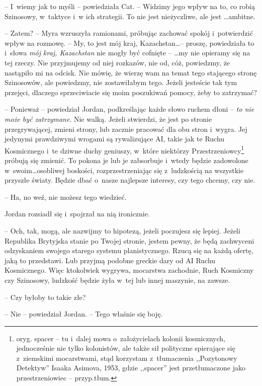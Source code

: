 \documentclass[oneside,polish,11pt,sfheadings]{mwbk}
\begin{document}
-- I~wiemy jak to myśli -- powiedziała Cat. -- Widzimy jego wpływ na to, co
robią Szinosowy, w~taktyce i~w ich strategii. To nie jest nieżyczliwe,
ale jest \ldots ambitne.

-- Zatem? -- Myra wzruszyła ramionami, próbując zachować spokój i~potwierdzić wpływ na rozmowę. -- My, to jest mój kraj, Kazachstan\ldots -- proszę, powiedziała to i~słowa \textit{mój kraj, Kazachstan} nie mogły być
cofnięte -- \ldots my nie opieramy się na tej rzeczy. Nie przyjmujemy od
niej rozkazów, nie od, cóż, powiedzmy, że nastąpiło mi na odcisk. Nie
mówię, że wierzę wam na temat tego stającego stronę Szinosowów, ale
powiedzmy, nie zostawiłabym tego. Jeżeli jesteście tak tym przejęci,
dlaczego sprzeciwiacie się moim poszukiwań pomocy, żeby to zatrzymać?

-- Ponieważ -- powiedział Jordan, podkreślając każde słowo ruchem dłoni -- \textit{to nie może być zatrzymane}. Nie walką. Jeżeli stwierdzi, że jest
po stronie przegrywającej, zmieni strony, lub zacznie pracować dla obu
stron i~wygra. Jej jedynymi prawdziwymi wrogami są rywalizujące AI,
takie jak te Ruchu Kosmicznego i~te dziwne duchy geniuszy, w~które
niektórzy Przestrzeniowcy\footnote{ oryg. spacer -- tu i~dalej mowa o~założycielach kolonii kosmicznych, jednocześnie nie tylko kolonistów,
ale także sił polityczne spierające się z~ziemskimi mocarstwami, stąd
korzystam z~tłumaczenia ,,Pozytonowy Detektyw'' Isaaka Asimova, 1953,
gdzie ,,spacer'' jest przetłumaczone jako przestrzeniowiec -- przyp.tłum.} próbują się zmienić. To pokona je lub je zabsorbuje i~wtedy będzie zadowolone w~swoim\ldots osobliwej boskości,
rozprzestrzeniając się z~ludzkością na wszystkie przyszłe światy. Będzie
dbać o~nasze najlepsze interesy, czy tego chcemy, czy nie.

-- Ha, no weź, nie możesz tego wiedzieć.

Jordan rozsiadł się i~spojrzał na nią ironicznie. 

-- Och, tak, mogą, ale
nazwijmy to hipotezą, jeżeli poczujesz się lepiej. Jeżeli Republika
Brytyjska stanie po Twojej stronie, jestem pewny, że będą zachwyceni
odzyskaniem swojego starego systemu planistycznego. Rzucą się na każdą
ofertę, jaką to przedstawi. Lub przyjmą podobne greckie dary od AI Ruchu
Kosmicznego. Więc ktokolwiek wygrywa, mocarstwa zachodnie, Ruch
Kosmiczny czy Szinosowy, ludzkość będzie żyła w~tej lub innej maszynie,
na zawsze.

-- Czy byłoby to takie złe?

-- Nie -- powiedział Jordan. -- Tego właśnie się boję.
\end{document}
